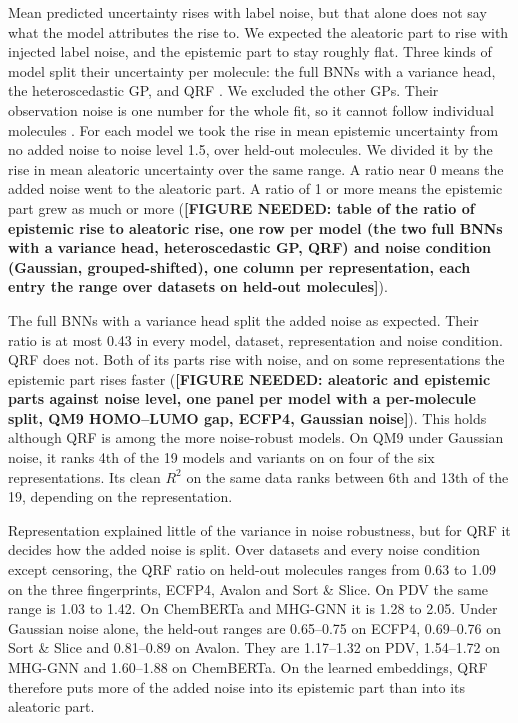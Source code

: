 Mean predicted uncertainty rises with label noise, but that alone does not say what the model attributes the rise to. We expected the aleatoric part to rise with injected label noise, and the epistemic part to stay roughly flat. Three kinds of model split their uncertainty per molecule: the full BNNs with a variance head, the heteroscedastic GP, and QRF \citep{kendall2017, Rasmussen2005, Meinshausen2006}. We excluded the other GPs. Their observation noise is one number for the whole fit, so it cannot follow individual molecules \citep{Rasmussen2005}. For each model we took the rise in mean epistemic uncertainty from no added noise to noise level 1.5, over held-out molecules. We divided it by the rise in mean aleatoric uncertainty over the same range. A ratio near 0 means the added noise went to the aleatoric part. A ratio of 1 or more means the epistemic part grew as much or more (\textbf{[FIGURE NEEDED: table of the ratio of epistemic rise to aleatoric rise, one row per model (the two full BNNs with a variance head, heteroscedastic GP, QRF) and noise condition (Gaussian, grouped-shifted), one column per representation, each entry the range over datasets on held-out molecules]}).

The full BNNs with a variance head split the added noise as expected. Their ratio is at most 0.43 in every model, dataset, representation and noise condition. QRF does not. Both of its parts rise with noise, and on some representations the epistemic part rises faster (\textbf{[FIGURE NEEDED: aleatoric and epistemic parts against noise level, one panel per model with a per-molecule split, QM9 HOMO--LUMO gap, ECFP4, Gaussian noise]}). This holds although QRF is among the more noise-robust models. On QM9 under Gaussian noise, it ranks 4th of the 19 models and variants on \aucnorm on four of the six representations. Its clean $R^2$ on the same data ranks between 6th and 13th of the 19, depending on the representation.

Representation explained little of the variance in noise robustness, but for QRF it decides how the added noise is split. Over datasets and every noise condition except censoring, the QRF ratio on held-out molecules ranges from 0.63 to 1.09 on the three fingerprints, ECFP4, Avalon and Sort \& Slice. On PDV the same range is 1.03 to 1.42. On ChemBERTa and MHG-GNN it is 1.28 to 2.05. Under Gaussian noise alone, the held-out ranges are 0.65--0.75 on ECFP4, 0.69--0.76 on Sort \& Slice and 0.81--0.89 on Avalon. They are 1.17--1.32 on PDV, 1.54--1.72 on MHG-GNN and 1.60--1.88 on ChemBERTa. On the learned embeddings, QRF therefore puts more of the added noise into its epistemic part than into its aleatoric part.

